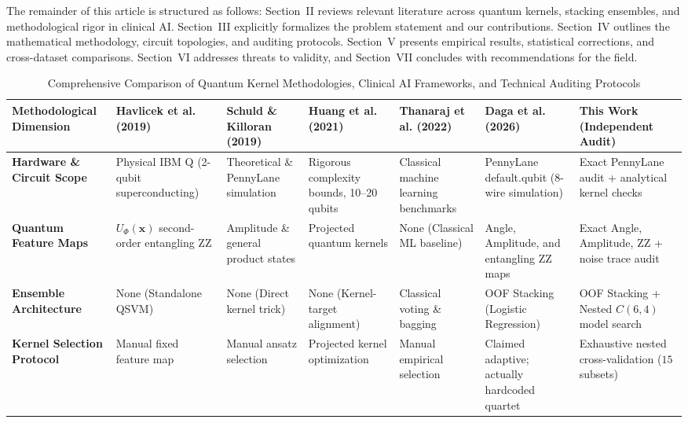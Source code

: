 \documentclass[journal,twocolumn]{IEEEtran}
\begin{document}
The remainder of this article is structured as follows: Section~II reviews relevant literature across quantum kernels, stacking ensembles, and methodological rigor in clinical AI. Section~III explicitly formalizes the problem statement and our contributions. Section~IV outlines the mathematical methodology, circuit topologies, and auditing protocols. Section~V presents empirical results, statistical corrections, and cross-dataset comparisons. Section~VI addresses threats to validity, and Section~VII concludes with recommendations for the field.

\begin{table}[t]
\centering
\caption{Comprehensive Comparison of Quantum Kernel Methodologies, Clinical AI Frameworks, and Technical Auditing Protocols}
\label{tab:lit_review_comparison}
\footnotesize
\begin{tabularx}{\textwidth}{lXXXXXX}
\toprule
\textbf{Methodological Dimension} & \textbf{Havlicek et al. (2019) \cite{havlicek2019supervised}} & \textbf{Schuld \& Killoran (2019) \cite{schuld2019quantum}} & \textbf{Huang et al. (2021) \cite{huang2021power}} & \textbf{Thanaraj et al. (2022) \cite{thanaraj2022comparative}} & \textbf{Daga et al. (2026) \cite{daga2026adaptive}} & \textbf{This Work (Independent Audit)} \\
\midrule
\textbf{Hardware \& Circuit Scope} & Physical IBM Q (2-qubit superconducting) & Theoretical \& PennyLane simulation & Rigorous complexity bounds, 10--20 qubits & Classical machine learning benchmarks & PennyLane default.qubit (8-wire simulation) & Exact PennyLane audit + analytical kernel checks \\
\textbf{Quantum Feature Maps} & $U_{\Phi}(\mathbf{x})$ second-order entangling ZZ & Amplitude \& general product states & Projected quantum kernels & None (Classical ML baseline) & Angle, Amplitude, and entangling ZZ maps & Exact Angle, Amplitude, ZZ + noise trace audit \\
\textbf{Ensemble Architecture} & None (Standalone QSVM) & None (Direct kernel trick) & None (Kernel-target alignment) & Classical voting \& bagging & OOF Stacking (Logistic Regression) & OOF Stacking + Nested $C(6,4)$ model search \\
\textbf{Kernel Selection Protocol} & Manual fixed feature map & Manual ansatz selection & Projected kernel optimization & Manual empirical selection & Claimed adaptive; actually hardcoded quartet & Exhaustive nested cross-validation ($15$ subsets) \\

\end{tabularx}
\end{table}
\end{document}
